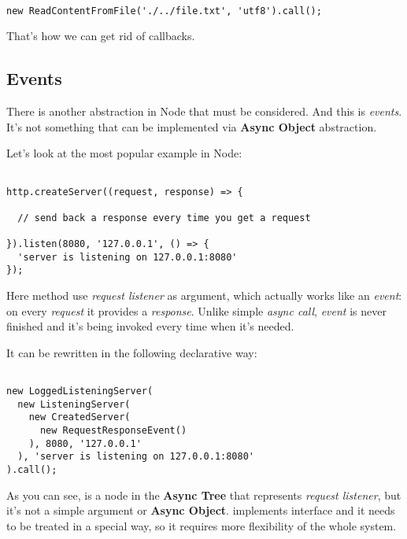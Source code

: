 \documentclass{article}
\newcommand{\cit}[1]{{\fontfamily{qcr}\selectfont{\textit{\textbf{\textcolor{darkgray}{#1}}}}}}
\begin{document}
\begin{lstlisting}

new ReadContentFromFile('./../file.txt', 'utf8').call();

\end{lstlisting}

That's how we can get rid of callbacks.

\subsection{Events}

There is another abstraction in Node that must be considered. And this is \textit{events}. It's not something that can be implemented via \textbf{Async Object} abstraction.

Let's look at the most popular example in Node:

\begin{lstlisting}

http.createServer((request, response) => {

  // send back a response every time you get a request

}).listen(8080, '127.0.0.1', () => {
  'server is listening on 127.0.0.1:8080'
});

\end{lstlisting}

Here method \cit{createServer} use \textit{request listener} as argument, which actually works like an \textit{event}: on every \textit{request} it provides a  \textit{response}. Unlike simple \textit{async call}, \textit{event} is never finished and it's being invoked every time when it's needed.

It can be rewritten in the following declarative way:

\begin{lstlisting}

new LoggedListeningServer(
  new ListeningServer(
    new CreatedServer(
      new RequestResponseEvent()
    ), 8080, '127.0.0.1'
  ), 'server is listening on 127.0.0.1:8080'
).call();

\end{lstlisting}

As you can see, \cit{RequestResponseEvent} is a node in the \textbf{Async Tree} that represents \textit{request listener}, but it's not a simple argument or \textbf{Async Object}. \cit{RequestResponseEvent} implements \cit{Event} interface and it needs to be treated in a special way, so it requires more flexibility of the whole system.
\end{document}
